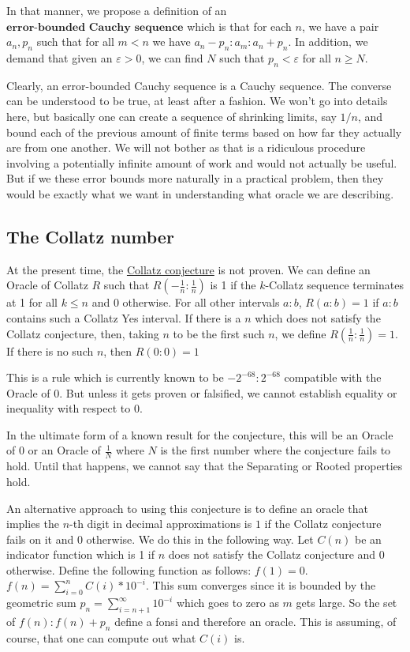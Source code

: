 \documentclass[12pt]{article}
\theoremstyle{remark}
\begin{document}
In that manner, we propose a definition of an $\textbf{error-bounded Cauchy sequence}$ which is that for each $n$, we have a pair $a_n, p_n$ such that for all $m<n$ we have $a_n-p_n : a_m : a_n+p_n$. In addition, we demand that given an $\varepsilon>0$, we can find $N$ such that $p_n < \varepsilon$ for all $n \geq N$. 

Clearly, an error-bounded Cauchy sequence is a Cauchy sequence. The converse can be understood to be true, at least after a fashion. We won't go into details here, but basically one can create a sequence of shrinking limits, say $1/n$, and bound each of the previous amount of finite terms based on how far they actually are from one another. We will not bother as that is a ridiculous procedure involving a potentially infinite amount of work and would not actually be useful. But if we these error bounds more naturally in a practical problem, then they would be exactly what we want in understanding what oracle we are describing.    


\subsection{The Collatz number}

At the present time, the \href{https://en.wikipedia.org/wiki/Collatz_conjecture}{Collatz conjecture} is not proven. We can define an Oracle of Collatz $R$ such that $R(-\tfrac{1}{n}:\tfrac{1}{n})$ is 1 if the $k$-Collatz sequence terminates at 1 for all $k \leq n$ and 0 otherwise. For all other intervals $a:b$, $R(a:b) = 1$ if $a:b$ contains such a Collatz Yes interval. If there is a $n$ which does not satisfy the Collatz conjecture, then, taking $n$ to be the first such $n$, we define $R(\tfrac{1}{n}:\tfrac{1}{n}) = 1$. If there is no such $n$, then $R(0:0) = 1$

This is a rule which is currently known to be $-2^{-68}:2^{-68}$ compatible with the Oracle of 0. But unless it gets proven or falsified, we cannot establish equality or inequality with respect to 0. 

In the ultimate form of a known result for the conjecture, this will be an Oracle of 0 or an Oracle of $\tfrac{1}{N}$ where $N$ is the first number where the conjecture fails to hold. Until that happens, we cannot say that the Separating or Rooted properties hold. 

An alternative approach to using this conjecture is to define an oracle that implies the $n$-th digit in decimal approximations is $1$ if the Collatz conjecture fails on it and $0$ otherwise. We do this in the following way. Let $C(n)$ be an indicator function which is 1 if $n$ does not satisfy the Collatz conjecture and 0 otherwise. Define the following function as follows: $f(1) = 0$. $f(n) = \sum_{i=0}^n C(i)*10^{-i} $. This sum converges since it is bounded by the geometric sum $p_n =\sum_{i=n+1}^{\infty} 10^{-i}$ which goes to zero as $m$ gets large. So the set of $f(n): f(n) + p_n $ define a fonsi and therefore an oracle. This is assuming, of course, that one can compute out what $C(i)$ is. 
\end{document}
